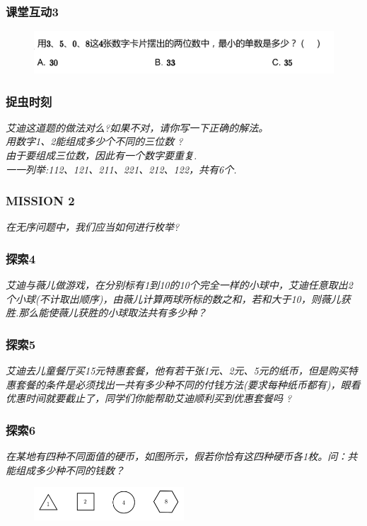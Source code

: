 \begin{frame}
    \frametitle{课堂互动3}
    \begin{figure}[H] 
        \centering
        \includegraphics[width=1\textwidth]{./pics/Chapter_2/ketanghudong3.png}
    \end{figure}
\end{frame}

\begin{frame}
    \frametitle{捉虫时刻}
    \textit{艾迪这道题的做法对么?如果不对，请你写一下正确的解法。\\
    用数字1、2能组成多少个不同的三位数 ?\\
    由于要组成三位数，因此有一个数字要重复.\\
    一一列举:112、121、211、221、212、122，共有6个.}
\end{frame}

\begin{frame}
    \frametitle{MISSION 2}
    \textit{在无序问题中，我们应当如何进行枚举?}
\end{frame}

\begin{frame}
    \frametitle{探索4}
    \textit{艾迪与薇儿做游戏，在分别标有1到10的10个完全一样的小球中，艾迪任意取出2个小球(不计取出顺序)，由薇儿计算两球所标的数之和，若和大于10，则薇儿获胜.那么能使薇儿获胜的小球取法共有多少种？}
\end{frame}

\begin{frame}
    \frametitle{探索5}
    \textit{艾迪去儿童餐厅买15元特惠套餐，他有若干张1元、2元、5元的纸币，但是购买特惠套餐的条件是必须找出一共有多少种不同的付钱方法(要求每种纸币都有)，眼看优惠时间就要截止了，同学们你能帮助艾迪顺利买到优惠套餐吗 ?}
\end{frame}

\begin{frame}
    \frametitle{探索6}
    \textit{在某地有四种不同面值的硬币，如图所示，假若你恰有这四种硬币各1枚。问：共能组成多少种不同的钱数？}
    \begin{figure}[H] 
        \centering
        \includegraphics[width=0.5\textwidth]{./pics/Chapter_2/tansuo6.png}
    \end{figure}
\end{frame}

